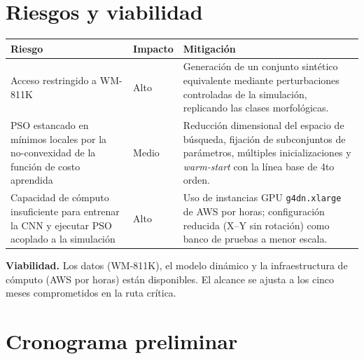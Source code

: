 \documentclass[11pt]{article}
\begin{document}
\section{Riesgos y viabilidad}

\begin{table}[H]
\centering
\small
\setlength{\tabcolsep}{6pt}
\renewcommand{\arraystretch}{1.4}
\begin{tabular}{L{4cm} C{1.6cm} L{8.5cm}}
\toprule
\textbf{Riesgo} & \textbf{Impacto} & \textbf{Mitigación} \\
\midrule
Acceso restringido a WM-811K & Alto & Generación de un conjunto sintético equivalente mediante perturbaciones controladas de la simulación, replicando las clases morfológicas. \\
PSO estancado en mínimos locales por la no-convexidad de la función de costo aprendida & Medio & Reducción dimensional del espacio de búsqueda, fijación de subconjuntos de parámetros, múltiples inicializaciones y \textit{warm-start} con la línea base de 4to orden. \\
Capacidad de cómputo insuficiente para entrenar la CNN y ejecutar PSO acoplado a la simulación & Alto & Uso de instancias GPU \texttt{g4dn.xlarge} de AWS por horas; configuración reducida (X--Y sin rotación) como banco de pruebas a menor escala. \\
\bottomrule
\end{tabular}
\end{table}

\textbf{Viabilidad.} Los datos (WM-811K), el modelo dinámico y la infraestructura de cómputo (AWS por horas) están disponibles. El alcance se ajusta a los cinco meses comprometidos en la ruta crítica.

\section{Cronograma preliminar}
\end{document}
